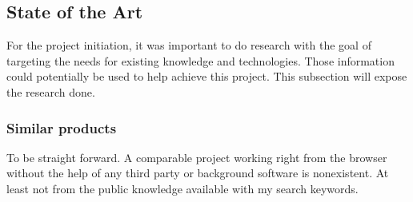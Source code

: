 
\subsection{State of the Art}
For the project initiation, it was important to do research with the goal of targeting the needs for existing knowledge and technologies. Those information could potentially be used to help achieve this project. This subsection will expose the research done.

\subsubsection{Similar products}
To be straight forward. A comparable project working right from the browser without the help of any third party or background software is nonexistent. At least not from the public knowledge available with my search keywords.









